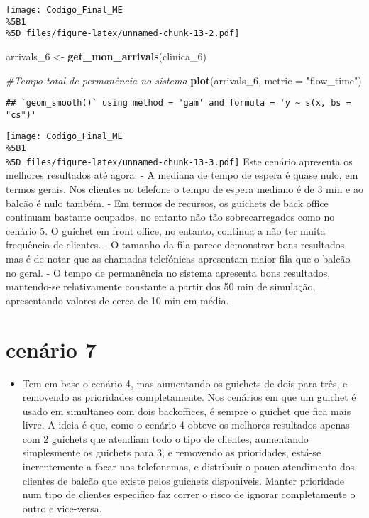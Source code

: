 \documentclass[
]{article}
\newenvironment{Shaded}{\begin{snugshade}}{\end{snugshade}}
\newcommand{\AttributeTok}[1]{\textcolor[rgb]{0.13,0.29,0.53}{#1}}
\newcommand{\CommentTok}[1]{\textcolor[rgb]{0.56,0.35,0.01}{\textit{#1}}}
\newcommand{\FunctionTok}[1]{\textcolor[rgb]{0.13,0.29,0.53}{\textbf{#1}}}
\newcommand{\NormalTok}[1]{#1}
\newcommand{\OtherTok}[1]{\textcolor[rgb]{0.56,0.35,0.01}{#1}}
\newcommand{\StringTok}[1]{\textcolor[rgb]{0.31,0.60,0.02}{#1}}
\providecommand{\tightlist}{%
  \setlength{\itemsep}{0pt}\setlength{\parskip}{0pt}}
\begin{document}
\texttt{[image: Codigo\_Final\_ME\\\%5B1\\\%5D\_files/figure-latex/unnamed-chunk-13-2.pdf]}

\begin{Shaded}
\begin{Highlighting}[]
\NormalTok{arrivals\_6 }\OtherTok{\textless{}{-}} \FunctionTok{get\_mon\_arrivals}\NormalTok{(clinica\_6)}

\CommentTok{\#Tempo total de permanência no sistema}
\FunctionTok{plot}\NormalTok{(arrivals\_6, }\AttributeTok{metric =} \StringTok{"flow\_time"}\NormalTok{)  }
\end{Highlighting}
\end{Shaded}

\begin{verbatim}
## `geom_smooth()` using method = 'gam' and formula = 'y ~ s(x, bs = "cs")'
\end{verbatim}

\texttt{[image: Codigo\_Final\_ME\\\%5B1\\\%5D\_files/figure-latex/unnamed-chunk-13-3.pdf]}
Este cenário apresenta os melhores resultados até agora. - A mediana de
tempo de espera é quase nulo, em termos gerais. Nos clientes ao telefone
o tempo de espera mediano é de 3 min e ao balcão é nulo também. - Em
termos de recursos, os guichets de back office continuam bastante
ocupados, no entanto não tão sobrecarregados como no cenário 5. O
guichet em front office, no entanto, continua a não ter muita frequência
de clientes. - O tamanho da fila parece demonstrar bons resultados, mas
é de notar que as chamadas telefónicas apresentam maior fila que o
balcão no geral. - O tempo de permanência no sistema apresenta bons
resultados, mantendo-se relativamente constante a partir dos 50 min de
simulação, apresentando valores de cerca de 10 min em média.

\section{cenário 7}\label{cenuxe1rio-7}

\begin{itemize}
\tightlist
\item
  Tem em base o cenário 4, mas aumentando os guichets de dois para três,
  e removendo as prioridades completamente. Nos cenários em que um
  guichet é usado em simultaneo com dois backoffices, é sempre o guichet
  que fica mais livre. A ideia é que, como o cenário 4 obteve os
  melhores resultados apenas com 2 guichets que atendiam todo o tipo de
  clientes, aumentando simplesmente os guichets para 3, e removendo as
  prioridades, está-se inerentemente a focar nos telefonemas, e
  distribuir o pouco atendimento dos clientes de balcão que existe pelos
  guichets disponiveis. Manter prioridade num tipo de clientes
  especifico faz correr o risco de ignorar completamente o outro e
  vice-versa.
\end{itemize}
\end{document}
